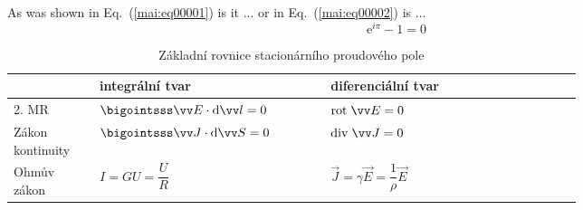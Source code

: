 \documentclass{scrbook}
\begin{document}
  \shorthandoff{-}

  \frontmatter
    
    \tableofcontents
  \mainmatter 
    \setcounter{page}{3} 

    As was shown in Eq.~(\ref{mai:eq00001}) is it
    ... or in Eq.~(\ref{mai:eq00002}) is ...
    \begin{equation}
      \mathrm{e}^{i\pi}-1=0 \label{fyz:eq00001}
    \end{equation}

    \begin{table}[ht!]
      \centering
      \begin{tabular}{m{0.1\linewidth}|m{0.29\linewidth}|m{0.34\linewidth}|}
        \cline{2-3}
        \multicolumn{1}{l|}{} 
          & \textbf{integrální tvar} & \textbf{diferenciální tvar}                              \\
        \hline        
        \multicolumn{1}{|m{0.19\linewidth}|}{2. MR}         
          & \(\bigointsss\vec{E}\cdot \dd{\vec{l}} = 0\) & \(\rot{E} = 0\)                      \\ 
        \cline{1-3}       
        \hline        
        \multicolumn{1}{|m{0.19\linewidth}|}{Zákon kontinuity}        
          & \(\bigointsss\vec{J}\cdot \dd{\vec{S}}=0\) & \(\diver{J}=0\)                        \\
        \cline{1-3}       
        \multicolumn{1}{|m{0.19\linewidth}|}{Ohmův zákon}       
          & \(I=GU=\dfrac{U}{R}\) & \(\vec{J} = \gamma\vec{E} = \dfrac{1}{\rho}\vec{E}\)        \\
        \cline{1-3}
      \end{tabular}
      \caption{Základní rovnice stacionárního proudového pole}
    \end{table}

    
  \backmatter
\end{document}
